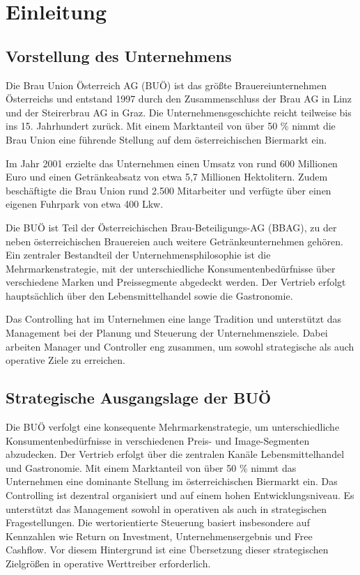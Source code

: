 \section{Einleitung}
\subsection{Vorstellung des Unternehmens}
Die Brau Union Österreich AG (BUÖ) ist das größte Brauereiunternehmen Österreichs und entstand 1997 durch den Zusammenschluss der Brau AG in Linz und der Steirerbrau AG in Graz. Die Unternehmensgeschichte reicht teilweise bis ins 15. Jahrhundert zurück. Mit einem Marktanteil von über 50 \% nimmt die Brau Union eine führende Stellung auf dem österreichischen Biermarkt ein. 

Im Jahr 2001 erzielte das Unternehmen einen Umsatz von rund 600 Millionen Euro und einen Getränkeabsatz von etwa 5,7 Millionen Hektolitern. Zudem beschäftigte die Brau Union rund 2.500 Mitarbeiter und verfügte über einen eigenen Fuhrpark von etwa 400 Lkw. 

Die BUÖ ist Teil der Österreichischen Brau-Beteiligungs-AG (BBAG), zu der neben österreichischen Brauereien auch weitere Getränkeunternehmen gehören. Ein zentraler Bestandteil der Unternehmensphilosophie ist die Mehrmarkenstrategie, mit der unterschiedliche Konsumentenbedürfnisse über verschiedene Marken und Preissegmente abgedeckt werden. Der Vertrieb erfolgt hauptsächlich über den Lebensmittelhandel sowie die Gastronomie. 

Das Controlling hat im Unternehmen eine lange Tradition und unterstützt das Management bei der Planung und Steuerung der Unternehmensziele. Dabei arbeiten Manager und Controller eng zusammen, um sowohl strategische als auch operative Ziele zu erreichen.
\subsection{Strategische Ausgangslage der BUÖ}

Die BUÖ verfolgt eine konsequente Mehrmarkenstrategie, um unterschiedliche Konsumentenbedürfnisse in verschiedenen Preis- und Image-Segmenten abzudecken. Der Vertrieb erfolgt über die zentralen Kanäle Lebensmittelhandel und Gastronomie. Mit einem Marktanteil von über 50 \% nimmt das Unternehmen eine dominante Stellung im österreichischen Biermarkt ein.
Das Controlling ist dezentral organisiert und auf einem hohen Entwicklungsniveau. Es unterstützt das Management sowohl in operativen als auch in strategischen Fragestellungen. Die wertorientierte Steuerung basiert insbesondere auf Kennzahlen wie Return on Investment, Unternehmensergebnis und Free Cashflow. Vor diesem Hintergrund ist eine Übersetzung dieser strategischen Zielgrößen in operative Werttreiber erforderlich.

